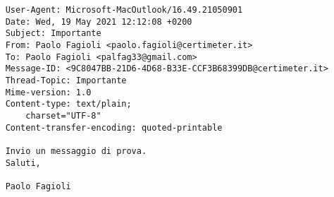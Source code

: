 \begin{verbatim}
    User-Agent: Microsoft-MacOutlook/16.49.21050901
    Date: Wed, 19 May 2021 12:12:08 +0200
    Subject: Importante
    From: Paolo Fagioli <paolo.fagioli@certimeter.it>
    To: Paolo Fagioli <palfag33@gmail.com>
    Message-ID: <9C8047BB-21D6-4D68-B33E-CCF3B68399DB@certimeter.it>
    Thread-Topic: Importante
    Mime-version: 1.0
    Content-type: text/plain;
        charset="UTF-8"
    Content-transfer-encoding: quoted-printable

    Invio un messaggio di prova.
    Saluti,

    Paolo Fagioli
\end{verbatim}
